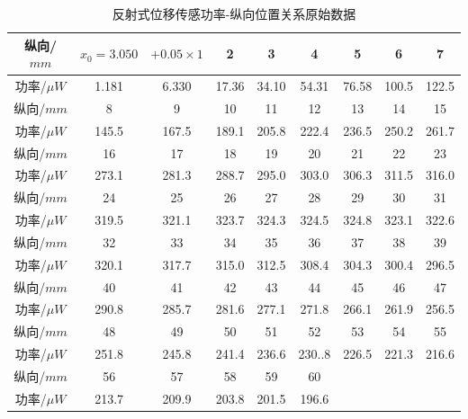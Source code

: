 \documentclass[a4paper,UTF8]{ctexart}
\begin{document}
\begin{table}[H]
    \centering
    \begin{tabular}{|c|c|c|c|c|c|c|c|c|}
    \hline
        纵向/$mm$ & $x_0 = 3.050$ & $+0.05 \times 1$ & 2 & 3 & 4 & 5 & 6 & 7 \\ \hline
        功率/$\mu W$ & 1.181 & 6.330 & 17.36 & 34.10 & 54.31 & 76.58 & 100.5 & 122.5 \\ \hline
        纵向/$mm$ & 8 & 9 & 10 & 11 & 12 & 13 & 14 & 15 \\ \hline
        功率/$\mu W$ & 145.5 & 167.5 & 189.1 & 205.8 & 222.4 & 236.5 & 250.2 & 261.7 \\ \hline
        纵向/$mm$ & 16 & 17 & 18 & 19 & 20 & 21 & 22 & 23 \\ \hline
        功率/$\mu W$ & 273.1 & 281.3 & 288.7 & 295.0 & 303.0 & 306.3 & 311.5 & 316.0 \\ \hline
        纵向/$mm$ & 24 & 25 & 26 & 27 & 28 & 29 & 30 & 31 \\ \hline
        功率/$\mu W$ & 319.5 & 321.1 & 323.7 & 324.3 & 324.5 & 324.8 & 323.1 & 322.6 \\ \hline
        纵向/$mm$ & 32 & 33 & 34 & 35 & 36 & 37 & 38 & 39 \\ \hline
        功率/$\mu W$ & 320.1 & 317.7 & 315.0 & 312.5 & 308.4 & 304.3 & 300.4 & 296.5 \\ \hline
        纵向/$mm$ & 40 & 41 & 42 & 43 & 44 & 45 & 46 & 47 \\ \hline
        功率/$\mu W$ & 290.8 & 285.7 & 281.6 & 277.1 & 271.8 & 266.1 & 261.9 & 256.5 \\ \hline
        纵向/$mm$ & 48 & 49 & 50 & 51 & 52 & 53 & 54 & 55 \\ \hline
        功率/$\mu W$ & 251.8 & 245.8 & 241.4 & 236.6 & 230..8 & 226.5 & 221.3 & 216.6 \\ \hline
        纵向/$mm$ & 56 & 57 & 58 & 59 & 60 & ~ & ~ & ~ \\ \hline
        功率/$\mu W$ & 213.7 & 209.9 & 203.8 & 201.5 & 196.6 & ~ & ~ & ~ \\ \hline
    \end{tabular}
    \caption{反射式位移传感功率-纵向位置关系原始数据}
\end{table}
\end{document}
